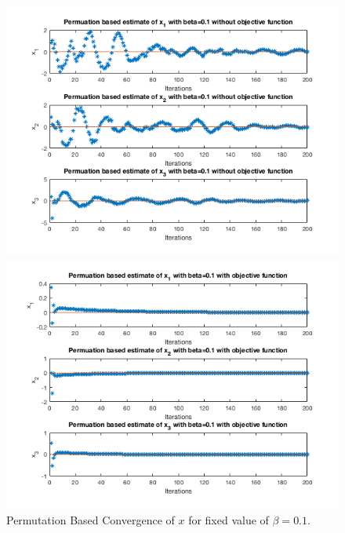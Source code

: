 \documentclass[answers]{exam}
\begin{document}
\begin{itemize}
\begin{framed}
\begin{figure}[H]
    \centering
    \caption{Permutation Based Convergence of $x$ for fixed value of $\beta=0.1$.}
    \begin{minipage}{.5\textwidth}
        \centering
        \includegraphics[width=1.1\textwidth, height=0.3\textheight]{Problem7_5.png}
    \end{minipage}%
    \begin{minipage}{0.5\textwidth}
        \centering
        \includegraphics[width=1.1\textwidth, height=0.3\textheight]{Problem7_6.png}
    \end{minipage}
    \label{p01}
\end{figure}



\end{framed}
\end{itemize}
\end{document}
